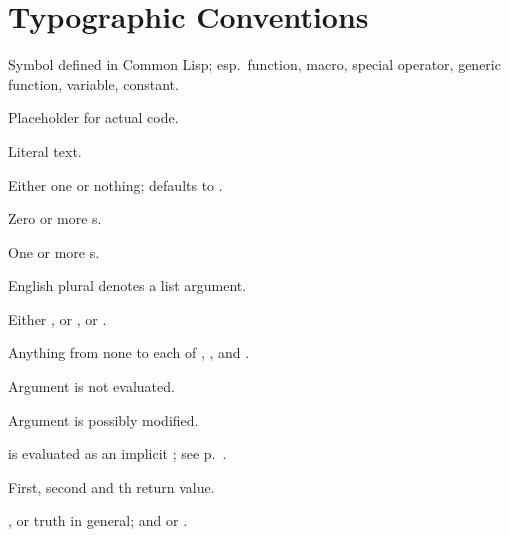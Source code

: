 %
%
\section*{Typographic Conventions}

\begin{LIST}{1cm}

  {
  Symbol defined in Common Lisp; esp.\ function, macro, special
  operator, generic function, variable, constant. 
  }

  {
  Placeholder for actual code.
  }

  {
  Literal text.
  }

  {
  Either one  or nothing; defaults to .
  }

  {
  Zero or more s.
  }

  {
  One or more s.
  }

  {
  English plural denotes a list argument.
  }

  {
  Either , or , or .
  }

  {
  Anything from none to each of , , and .
  }

  {
  Argument  is not evaluated.
  }

  {
  Argument  is possibly modified.
  }

  {
   is evaluated as an implicit ; see p.\ \pageref{:progn}.
  }

  {
  First, second and th return value.
  }

  \IT{\T; \NIL\qquad\qquad\qquad}
  {
  , or truth in general; and  or \kwd{()}.
  }
  
\end{LIST}
